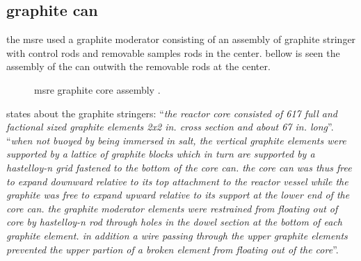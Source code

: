 \documentclass{article}
\begin{document}
\begin{preview}
\section{graphite can}
the msre used a graphite moderator consisting of an assembly of graphite stringer with control rods and removable samples rods in the center. bellow is seen the assembly of the can outwith the removable rods at the center.
\begin{figure}[H]
  \centering
  \caption{msre graphite core assembly \parencite{ornl}.}
  \label{core-assembly}
\end{figure}
\textcite[page 112 and 114]{ornl-tm-3039} states about the graphite stringers: \enquote{\textit{the reactor core consisted of 617 full and factional sized graphite elements 2x2 in. cross section and about 67 in. long}}. \enquote{\textit{when not buoyed by being immersed in salt, the vertical graphite elements were supported by a lattice of graphite blocks which in turn are supported by a hastelloy-n grid fastened to the bottom of the core can. the core can was thus free to expand downward relative to its top attachment to the reactor vessel while the graphite was free to expand upward relative to its support at the lower end of the core can. the graphite moderator elements were restrained from floating out of core by hastelloy-n rod through holes in the dowel section at the bottom of each graphite element. in addition a wire passing through the upper graphite elements prevented the upper partion of a broken element from floating out of the core}}.


\end{preview}
\end{document}
